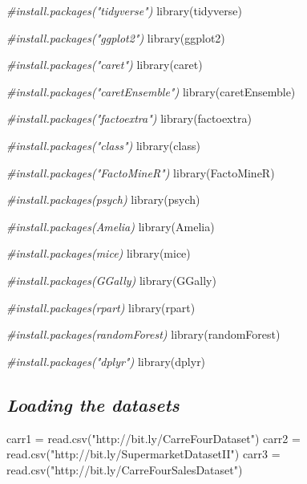 \documentclass[
]{article}
\newenvironment{Shaded}{\begin{snugshade}}{\end{snugshade}}
\newcommand{\CommentTok}[1]{\textcolor[rgb]{0.56,0.35,0.01}{\textit{#1}}}
\newcommand{\FunctionTok}[1]{\textcolor[rgb]{0.00,0.00,0.00}{#1}}
\newcommand{\NormalTok}[1]{#1}
\newcommand{\OtherTok}[1]{\textcolor[rgb]{0.56,0.35,0.01}{#1}}
\newcommand{\StringTok}[1]{\textcolor[rgb]{0.31,0.60,0.02}{#1}}
\begin{document}
\begin{Shaded}
\begin{Highlighting}[]
\CommentTok{\#install.packages("tidyverse")}
\FunctionTok{library}\NormalTok{(tidyverse)}

\CommentTok{\#install.packages("ggplot2")}
\FunctionTok{library}\NormalTok{(ggplot2)}

\CommentTok{\#install.packages("caret")}
\FunctionTok{library}\NormalTok{(caret)}

\CommentTok{\#install.packages("caretEnsemble")}
\FunctionTok{library}\NormalTok{(caretEnsemble)}

\CommentTok{\#install.packages("factoextra")}
\FunctionTok{library}\NormalTok{(factoextra)}

\CommentTok{\#install.packages("class")}
\FunctionTok{library}\NormalTok{(class)}

\CommentTok{\#install.packages("FactoMineR")}
\FunctionTok{library}\NormalTok{(FactoMineR)}

\CommentTok{\#install.packages(\textquotesingle{}psych\textquotesingle{})}
\FunctionTok{library}\NormalTok{(psych)}

\CommentTok{\#install.packages(\textquotesingle{}Amelia\textquotesingle{})}
\FunctionTok{library}\NormalTok{(Amelia)}

\CommentTok{\#install.packages(\textquotesingle{}mice\textquotesingle{})}
\FunctionTok{library}\NormalTok{(mice)}

\CommentTok{\#install.packages(\textquotesingle{}GGally\textquotesingle{})}
\FunctionTok{library}\NormalTok{(GGally)}

\CommentTok{\#install.packages(\textquotesingle{}rpart\textquotesingle{})}
\FunctionTok{library}\NormalTok{(rpart)}

\CommentTok{\#install.packages(\textquotesingle{}randomForest\textquotesingle{})}
\FunctionTok{library}\NormalTok{(randomForest)}

\CommentTok{\#install.packages("dplyr")}
\FunctionTok{library}\NormalTok{(dplyr)}
\end{Highlighting}
\end{Shaded}

\hypertarget{loading-the-datasets}{%
\subsection{\texorpdfstring{\textbf{\emph{Loading the
datasets}}}{Loading the datasets}}\label{loading-the-datasets}}

\begin{Shaded}
\begin{Highlighting}[]
\NormalTok{carr1 }\OtherTok{=} \FunctionTok{read.csv}\NormalTok{(}\StringTok{"http://bit.ly/CarreFourDataset"}\NormalTok{)}
\NormalTok{carr2 }\OtherTok{=} \FunctionTok{read.csv}\NormalTok{(}\StringTok{"http://bit.ly/SupermarketDatasetII"}\NormalTok{)}
\NormalTok{carr3 }\OtherTok{=} \FunctionTok{read.csv}\NormalTok{(}\StringTok{"http://bit.ly/CarreFourSalesDataset"}\NormalTok{)}
\end{Highlighting}
\end{Shaded}
\end{document}
